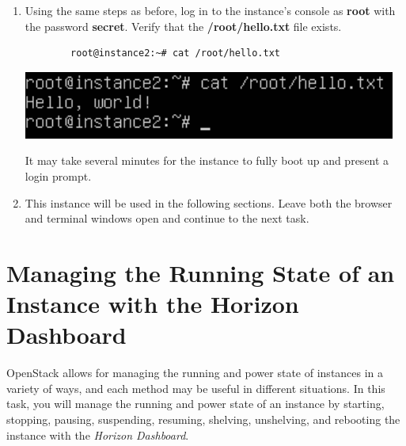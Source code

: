 \documentclass[letterpaper, 12pt]{article}
\begin{document}
\begin{enumerate}
    \item Using the same steps as before, log in to the instance's console as \textbf{root} with the password \textbf{secret}.
    Verify that the \textbf{/root/hello.txt} file exists.
    \begin{lstlisting}
        root@instance2:~# cat /root/hello.txt
    \end{lstlisting}

    \begin{center}
        \includegraphics[width=\linewidth]{images/part2/step15.png}
    \end{center}

    \begin{notebox}
        It may take several minutes for the instance to fully boot up and present a login prompt.
    \end{notebox}

    \item This instance will be used in the following sections.
    Leave both the browser and terminal windows open and continue to the next task.

\end{enumerate}


\section{Managing the Running State of an Instance with the Horizon Dashboard}
\label{sec:managing_the_running_state_of_an_instance_web}
OpenStack allows for managing the running and power state of instances in a variety of ways, and each method may be useful in different situations.
In this task, you will manage the running and power state of an instance by starting, stopping, pausing, suspending, resuming, shelving, unshelving, and rebooting the instance with the \textit{Horizon Dashboard}.
\end{document}
